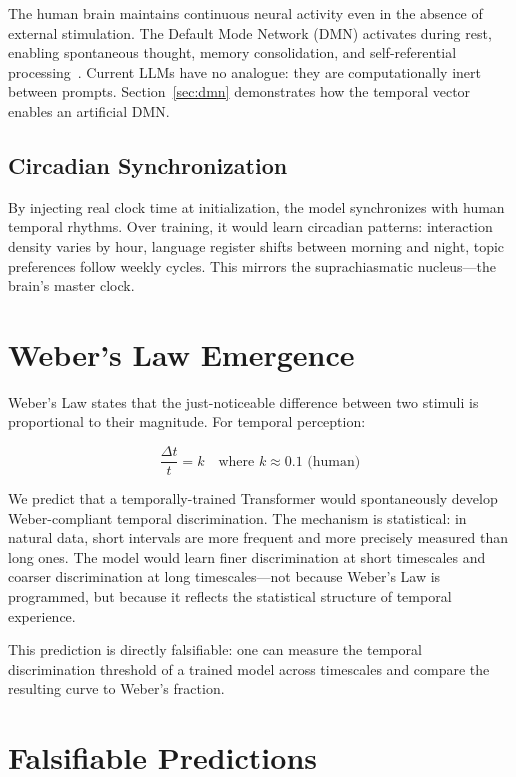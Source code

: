 \documentclass[10pt,twocolumn,letterpaper]{article}
\begin{document}
The human brain maintains continuous neural activity even in the absence of external stimulation. The Default Mode Network (DMN) activates during rest, enabling spontaneous thought, memory consolidation, and self-referential processing~\cite{raichle2001}. Current LLMs have no analogue: they are computationally inert between prompts. Section~\ref{sec:dmn} demonstrates how the temporal vector enables an artificial DMN.

\subsection{Circadian Synchronization}

By injecting real clock time at initialization, the model synchronizes with human temporal rhythms. Over training, it would learn circadian patterns: interaction density varies by hour, language register shifts between morning and night, topic preferences follow weekly cycles. This mirrors the suprachiasmatic nucleus---the brain's master clock.

\section{Weber's Law Emergence}

Weber's Law states that the just-noticeable difference between two stimuli is proportional to their magnitude. For temporal perception:

\begin{equation}
\frac{\Delta t}{t} = k \quad \text{where } k \approx 0.1 \text{ (human)}
\label{eq:weber}
\end{equation}

We predict that a temporally-trained Transformer would spontaneously develop Weber-compliant temporal discrimination. The mechanism is statistical: in natural data, short intervals are more frequent and more precisely measured than long ones. The model would learn finer discrimination at short timescales and coarser discrimination at long timescales---not because Weber's Law is programmed, but because it reflects the statistical structure of temporal experience.

This prediction is directly falsifiable: one can measure the temporal discrimination threshold of a trained model across timescales and compare the resulting curve to Weber's fraction.

\section{Falsifiable Predictions}
\end{document}
